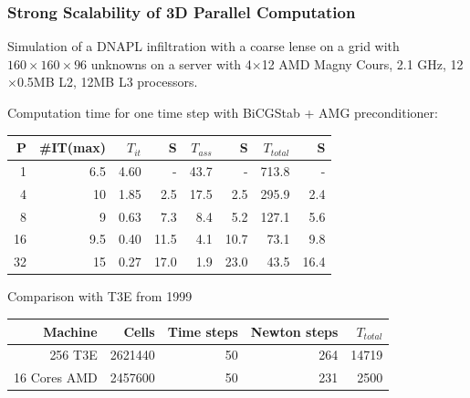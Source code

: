 \begin{frame}
\frametitle<presentation>{Strong Scalability of 3D Parallel Computation}
Simulation of a DNAPL infiltration with a coarse lense on a grid with  $160 \times 160 \times 96$
unknowns on a server with 4$\times$12  AMD Magny Cours, 2.1 GHz, 12$\times$0.5MB L2, 12MB
L3 processors.

Computation time for one time step with BiCGStab + AMG preconditioner:

\begin{center}
\begin{tabular}{r|rrr|rr|rr}
\hline
P  & \#IT(max) & $T_{it}$ & S & $T_{ass}$ & S & $T_{total}$ & S \\
\hline
 1  &  6.5 & 4.60 &      - &  43.7 &      - & 713.8 &    - \\
 4  &  10  & 1.85 &   2.5 &  17.5 &   2.5 & 295.9 & 2.4 \\
 8  &  9    & 0.63 &   7.3 &    8.4 &   5.2 & 127.1 & 5.6 \\
16 &  9.5 & 0.40 & 11.5 &    4.1 & 10.7 &   73.1 & 9.8 \\
32 &  15  & 0.27 & 17.0 &    1.9 & 23.0 &   43.5 & 16.4 \\ 
\hline
\end{tabular}
\end{center} 

Comparison with T3E from 1999

\begin{center}
\begin{tabular}{r|rrrr}
\hline
Machine  & Cells & Time steps & Newton steps & $T_{total}$ \\
\hline
256 T3E        & 2621440 &  50 & 264 & 14719\\
16 Cores AMD & 2457600 & 50 & 231 & 2500\\ 
\hline
\end{tabular}
\end{center} 
\end{frame}



